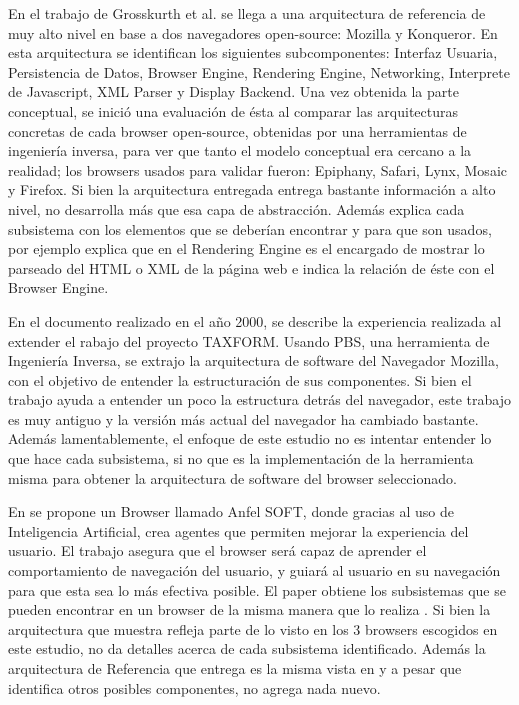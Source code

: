 
En el trabajo de Grosskurth et al. \cite{2005-grosskurth-browser-refarch, preprint-grosskurth-browser-archevol} se llega a una arquitectura de referencia de muy alto nivel en base a dos navegadores open-source: Mozilla y Konqueror. En esta arquitectura se identifican los siguientes subcomponentes: Interfaz Usuaria, Persistencia de Datos, Browser Engine, Rendering Engine, Networking, Interprete de Javascript, XML Parser y Display Backend. Una vez obtenida la parte conceptual, se inició una evaluación de ésta al comparar las arquitecturas concretas de cada browser open-source, obtenidas por una herramientas de ingeniería inversa, para ver que tanto el modelo conceptual era cercano a la realidad; los browsers usados para validar fueron: Epiphany, Safari, Lynx, Mosaic y Firefox. Si bien la arquitectura entregada entrega bastante información a alto nivel, no desarrolla más que esa capa de abstracción. Además explica cada subsistema con los elementos que se deberían encontrar y para que son usados, por ejemplo explica que en el Rendering Engine es el encargado de mostrar lo parseado del HTML o XML de la página web e indica la relación de éste con el Browser Engine. 


En el documento \cite{Godfrey2000} realizado en el año 2000, se describe la experiencia realizada al extender el rabajo del proyecto TAXFORM. Usando PBS, una herramienta de Ingeniería Inversa, se extrajo la arquitectura de software del Navegador Mozilla, con el objetivo de entender la estructuración de sus componentes. Si bien el trabajo ayuda a entender un poco la estructura detrás del navegador, este trabajo es muy antiguo y la versión más actual del navegador ha cambiado bastante. Además lamentablemente, el enfoque de este estudio no es intentar entender lo que hace cada subsistema, si no que es la implementación de la herramienta misma para obtener la arquitectura de software del browser seleccionado.

En \cite{Lwin2009} se propone un Browser llamado Anfel SOFT, donde gracias al uso de Inteligencia Artificial, crea agentes que permiten mejorar la experiencia del usuario. El trabajo asegura que el browser será capaz de aprender el comportamiento de navegación del usuario, y guiará al usuario en su navegación para que esta sea lo más efectiva posible. El paper obtiene los subsistemas que se pueden encontrar en un browser de la misma manera que lo realiza \cite{2005-grosskurth-browser-refarch}. Si bien la arquitectura que muestra refleja parte de lo visto en los 3 browsers escogidos en este estudio, no da detalles acerca de cada subsistema identificado. Además la arquitectura de Referencia que entrega es la misma vista en \cite{2005-grosskurth-browser-refarch, preprint-grosskurth-browser-archevol} y a pesar que identifica otros posibles componentes, no agrega nada nuevo.


